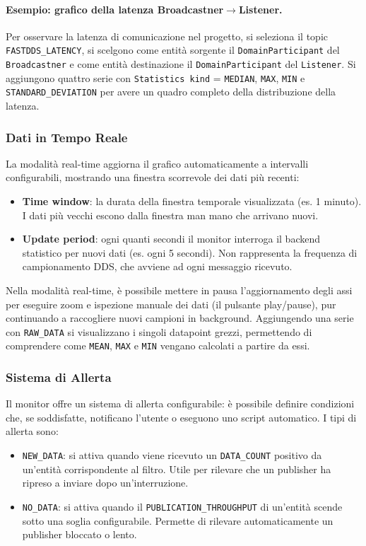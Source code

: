\paragraph{Esempio: grafico della latenza Broadcastner$\to$Listener.}
Per osservare la latenza di comunicazione nel progetto, si seleziona il topic \texttt{FASTDDS\_LATENCY}, si scelgono come entità sorgente il \texttt{DomainParticipant} del \texttt{Broadcastner} e come entità destinazione il \texttt{DomainParticipant} del \texttt{Listener}. Si aggiungono quattro serie con \texttt{Statistics kind} = \texttt{MEDIAN}, \texttt{MAX}, \texttt{MIN} e \texttt{STANDARD\_DEVIATION} per avere un quadro completo della distribuzione della latenza. 
\subsubsection{Dati in Tempo Reale}

La modalità real-time aggiorna il grafico automaticamente a intervalli configurabili, mostrando una finestra scorrevole dei dati più recenti:

\begin{itemize}
	\item \textbf{Time window}: la durata della finestra temporale visualizzata (es. 1 minuto). I dati più vecchi escono dalla finestra man mano che arrivano nuovi.
	\item \textbf{Update period}: ogni quanti secondi il monitor interroga il backend statistico per nuovi dati (es. ogni 5 secondi). Non rappresenta la frequenza di campionamento DDS, che avviene ad ogni messaggio ricevuto.
\end{itemize}

Nella modalità real-time, è possibile mettere in pausa l'aggiornamento degli assi per eseguire zoom e ispezione manuale dei dati (il pulsante play/pause), pur continuando a raccogliere nuovi campioni in background. Aggiungendo una serie con \texttt{RAW\_DATA} si visualizzano i singoli datapoint grezzi, permettendo di comprendere come \texttt{MEAN}, \texttt{MAX} e \texttt{MIN} vengano calcolati a partire da essi.

\subsubsection{Sistema di Allerta}

Il monitor offre un sistema di allerta configurabile: è possibile definire condizioni che, se soddisfatte, notificano l'utente o eseguono uno script automatico. I tipi di allerta sono:
\begin{itemize}
	\item \texttt{NEW\_DATA}: si attiva quando viene ricevuto un \texttt{DATA\_COUNT} positivo da un'entità corrispondente al filtro. Utile per rilevare che un publisher ha ripreso a inviare dopo un'interruzione.
	\item \texttt{NO\_DATA}: si attiva quando il \texttt{PUBLICATION\_THROUGHPUT} di un'entità scende sotto una soglia configurabile. Permette di rilevare automaticamente un publisher bloccato o lento.
\end{itemize}

